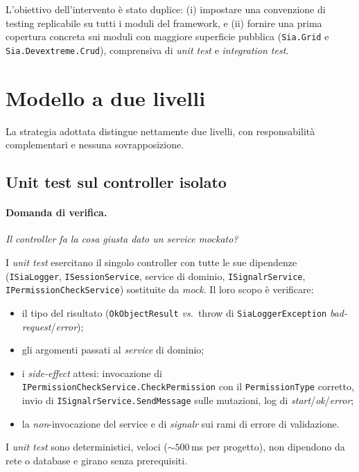 L'obiettivo dell'intervento è stato duplice: (i) impostare una convenzione di testing replicabile su tutti i moduli del framework, e (ii) fornire una prima copertura concreta sui moduli con maggiore superficie pubblica (\texttt{Sia.Grid} e \texttt{Sia.Devextreme.Crud}), comprensiva di \emph{unit test} e \emph{integration test}.

\section{Modello a due livelli}

La strategia adottata distingue nettamente due livelli, con responsabilità complementari e nessuna sovrapposizione.

\subsection{Unit test sul controller isolato}

\paragraph{Domanda di verifica.} \emph{Il controller fa la cosa giusta dato un service mockato?}

I \emph{unit test} esercitano il singolo controller con tutte le sue dipendenze (\texttt{ISiaLogger}, \texttt{ISessionService}, service di dominio, \texttt{ISignalrService}, \texttt{IPermissionCheckService}) sostituite da \emph{mock}. Il loro scopo è verificare:
\begin{itemize}
    \item il tipo del risultato (\texttt{OkObjectResult} \emph{vs.}\ throw di \texttt{SiaLoggerException} \emph{bad-request}/\emph{error});
    \item gli argomenti passati al \emph{service} di dominio;
    \item i \emph{side-effect} attesi: invocazione di \texttt{IPermissionCheckService.CheckPermission} con il \texttt{PermissionType} corretto, invio di \texttt{ISignalrService.SendMessage} sulle mutazioni, log di \emph{start}/\emph{ok}/\emph{error};
    \item la \emph{non}-invocazione del service e di \emph{signalr} sui rami di errore di validazione.
\end{itemize}

I \emph{unit test} sono deterministici, veloci ($\sim 500$\,ms per progetto), non dipendono da rete o database e girano senza prerequisiti.

